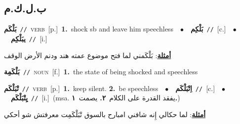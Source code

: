 \documentclass[10pt,a4paper,twoside]{article} %
\begin{document}
\begin{multicols}{2}
\vspace{-3mm}
\subsection*{\color{blue}\foreignlanguage{arabic}{ب.ل.ك.م}\color{blue}{}} 

{\setlength\topsep{0pt}\textbf{\foreignlanguage{arabic}{بَلْكَم}}\ {\color{gray}\texttt{//}\color{black}}\ \textsc{verb}\ [p.]\ \textbf{1.}~shock sb and leave him speechless\ \ $\bullet$\ \ \setlength\topsep{0pt}\textbf{\foreignlanguage{arabic}{بَلْكِم}}\ {\color{gray}\texttt{//}\color{black}}\ [c.]\ \ $\bullet$\ \ \setlength\topsep{0pt}\textbf{\foreignlanguage{arabic}{يبَلْكِم}}\ {\color{gray}\texttt{//}\color{black}}\ [i.]\  \begin{flushright}\color{gray}\foreignlanguage{arabic}{\textbf{\underline{\foreignlanguage{arabic}{أمثلة}}}: بَلْكَمني لما فتح موضوع عمته هند ودنم الأرض الوقف}\end{flushright}\color{black}} \vspace{2mm}

{\setlength\topsep{0pt}\textbf{\foreignlanguage{arabic}{بَلْكَمِة}}\ {\color{gray}\texttt{//}\color{black}}\ \textsc{noun}\ [f.]\ \textbf{1.}~the state of being shocked and speechless\ } \vspace{2mm}

{\setlength\topsep{0pt}\textbf{\foreignlanguage{arabic}{تْبَلْكَم}}\ {\color{gray}\texttt{//}\color{black}}\ \textsc{verb}\ [p.]\ \textbf{1.}~keep silent.  \textbf{2.}~be speechless\ \ $\bullet$\ \ \setlength\topsep{0pt}\textbf{\foreignlanguage{arabic}{اِتْبَلْكَم}}\ {\color{gray}\texttt{//}\color{black}}\ [c.]\ \ $\bullet$\ \ \setlength\topsep{0pt}\textbf{\foreignlanguage{arabic}{يِتْبَلْكَم}}\ {\color{gray}\texttt{//}\color{black}}\ [i.]\ \color{gray}(msa. \foreignlanguage{arabic}{يفقد القدرة على الكلام}~\foreignlanguage{arabic}{\textbf{٢.}}  \foreignlanguage{arabic}{يصمت}~\foreignlanguage{arabic}{\textbf{١.}})\color{black}\  \begin{flushright}\color{gray}\foreignlanguage{arabic}{\textbf{\underline{\foreignlanguage{arabic}{أمثلة}}}: لما حكالي إِنه شافني امبارح بالسوق تْبَلْكَمِت معرفتش شو أحكي}\end{flushright}\color{black}} \vspace{2mm}


\end{multicols}
\end{document}
